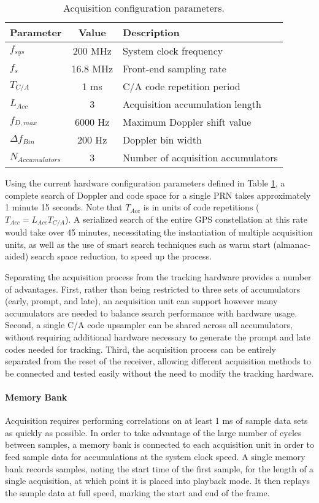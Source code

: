 \documentclass[12pt]{article}
\begin{document}
\begin{table}[h]
\centering
\begin{tabular}{ l c l }
    \hline \hline
    Parameter & Value & Description \\
    \hline
    $f_{sys}$ & 200 MHz & System clock frequency \\
    $f_s$ & 16.8 MHz & Front-end sampling rate \\
    $T_{C/A}$ & 1 ms & C/A code repetition period \\
    $L_{Acc}$ & 3 & Acquisition accumulation length \\
    $f_{D,max}$ & 6000 Hz & Maximum Doppler shift value \\
    $\Delta f_{Bin}$ & 200 Hz & Doppler bin width \\
    $N_{Accumulators}$ & 3 & Number of acquisition accumulators \\
    \hline
\end{tabular}
\caption{Acquisition configuration parameters.}
\label{tbl:acq configuration}
\end{table}

Using the current hardware configuration parameters defined in Table \ref{tbl:acq configuration}, a complete search of Doppler and code space for a single PRN takes approximately 1 minute 15 seconds.  Note that $T_{Acc}$ is in units of code repetitions ($T_{Acc} = L_{Acc} T_{C/A}$). A serialized search of the entire GPS constellation at this rate would take over 45 minutes, necessitating the instantiation of multiple acquisition units, as well as the use of smart search techniques such as warm start (almanac-aided) search space reduction, to speed up the process.

Separating the acquisition process from the tracking hardware provides a number of advantages. First, rather than being restricted to three sets of accumulators (early, prompt, and late), an acquisition unit can support however many accumulators are needed to balance search performance with hardware usage. Second, a single C/A code upsampler can be shared across all accumulators, without requiring additional hardware necessary to generate the prompt and late codes needed for tracking. Third, the acquisition process can be entirely separated from the reset of the receiver, allowing different acquisition methods to be connected and tested easily without the need to modify the tracking hardware.

\paragraph{Memory Bank}
Acquisition requires performing correlations on at least 1 ms of sample data sets as quickly as possible. In order to take advantage of the large number of cycles between samples, a memory bank is connected to each acquisition unit in order to feed sample data for accumulations at the system clock speed. A single memory bank records samples, noting the start time of the first sample, for the length of a single acquisition, at which point it is placed into playback mode. It then replays the sample data at full speed, marking the start and end of the frame.
\end{document}

